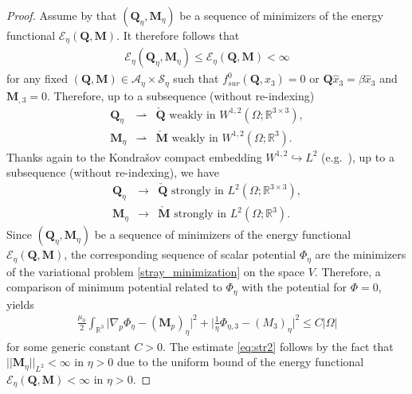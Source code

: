 \documentclass{article}
\def\Qvec{\mathbf{Q}}
\def \Mvec{\mathbf{M}}
\begin{document}
\begin{proof}
Assume by  that $\left(\Qvec_{\eta}, \Mvec_{\eta}\right)$ be a sequence of minimizers of the energy functional $\mathcal{E}_{\eta}\left(\Qvec, \Mvec\right)$. It therefore follows that 
\begin{eqnarray}
\mathcal{E}_{\eta}\left(\Qvec_{\eta}, \Mvec_{\eta}\right)\le\mathcal{E}_{\eta}\left(\Qvec, \Mvec\right)<\infty\label{eq:str1}
\end{eqnarray}
for any fixed $\left(\Qvec, \Mvec\right)\in \mathcal{A}_{\eta}\times \mathcal{S}_{\eta}$ such that $f^0_{sur}\left(\Qvec, \hat{x}_3\right)=0$ or $\Qvec\hat{x}_3=\beta\hat{x}_3$ and $\Mvec_{,3}=0$. Therefore, up to a subsequence (without re-indexing)
\begin{eqnarray}
\Qvec_{\eta}&\rightharpoonup&\check{\Qvec}\mbox{ weakly in } W^{1,2}\left(\Omega; \mathbb R^{3\times 3}\right),\label{eq:Q}\\
\Mvec_{\eta}&\rightharpoonup&\check{\Mvec}\mbox{ weakly in } W^{1,2}\left(\Omega; \mathbb R^{3}\right).\label{eq:M}
\end{eqnarray}
Thanks again to the Kondra\v{s}ov compact embedding $W^{1,2}\hookrightarrow L^2$ (e.g.\ \cite{ciarlet2021mathematical}), up to a subsequence (without re-indexing), we have
\begin{eqnarray}
\Qvec_{\eta}&\rightarrow&\check{\Qvec}\mbox{ strongly in } L^{2}\left(\Omega; \mathbb R^{3\times 3}\right),\label{eq:Q'}\\
\Mvec_{\eta}&\rightarrow&\check{\Mvec}\mbox{ strongly in } L^{2}\left(\Omega; \mathbb R^{3}\right).\label{eq:M'}
\end{eqnarray}
Since $\left(\Qvec_{\eta}, \Mvec_{\eta}\right)$ be a sequence of minimizers of the energy functional $\mathcal{E}_{\eta}\left(\Qvec, \Mvec\right)$, the corresponding sequence of scalar potential $\Phi_{\eta}$ are the minimizers of the variational problem \eqref{stray_minimization} on the space $V$. Therefore, a comparison of minimum potential related to $\Phi_{\eta}$ with the potential for $\Phi=0$, yields
\begin{eqnarray}
\frac{\mu_0}{2}\int_{\mathbb R^3}\bigg|\nabla_p\Phi_{\eta}-\left(\Mvec_p\right)_{\eta}\bigg|^2 + \bigg|\frac{1}{\eta}\Phi_{\eta,3}-\left(M_{3}\right)_{\eta}\bigg|^2\le C|\Omega|\label{eq:str2}
\end{eqnarray}
for some generic constant $C>0$. The estimate \eqref{eq:str2} follows by the fact that $||\Mvec_{\eta}||_{L^2}<\infty$ in $\eta>0$ due to the uniform bound of the energy functional $\mathcal{E}_{\eta}\left(\Qvec, \Mvec\right)<\infty$ in $\eta>0$.

\end{proof}
\end{document}
